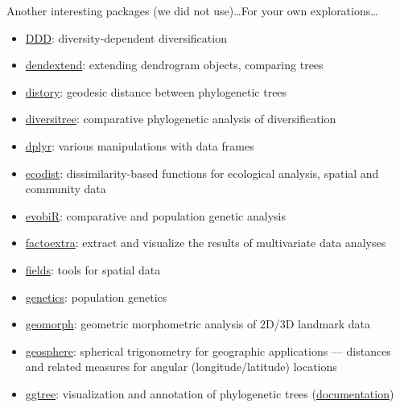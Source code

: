\documentclass[compress, xelatex, 11pt, xcolor=svgnames, aspectratio=169, url={hyphens, lowtilde}]{beamer}
\begin{document}
\begin{frame}[allowframebreaks]{Another interesting packages (we did not use)\ldots}{For your own explorations\ldots}
\begin{itemize}
		\item \href{https://CRAN.R-project.org/package=DDD}{DDD}: diversity-dependent diversification
		\item \href{https://CRAN.R-project.org/package=dendextend}{dendextend}: extending dendrogram objects, comparing trees
		\item \href{https://CRAN.R-project.org/package=distory}{distory}: geodesic distance between phylogenetic trees
		\item \href{https://CRAN.R-project.org/package=diversitree}{diversitree}: comparative phylogenetic analysis of diversification
		\item \href{https://CRAN.R-project.org/package=dplyr}{dplyr}: various manipulations with data frames
		\item \href{https://CRAN.R-project.org/package=ecodist}{ecodist}: dissimilarity-based functions for ecological analysis, spatial and community data
		\item \href{https://CRAN.R-project.org/package=evobiR}{evobiR}: comparative and population genetic analysis
		\item \href{https://CRAN.R-project.org/package=factoextra}{factoextra}: extract and visualize the results of multivariate data analyses
		\item \href{https://CRAN.R-project.org/package=fields}{fields}: tools for spatial data
		\item \href{https://CRAN.R-project.org/package=genetics}{genetics}: population genetics
		\item \href{https://CRAN.R-project.org/package=geomorph}{geomorph}: geometric morphometric analysis of 2D/3D landmark data
		\item \href{https://CRAN.R-project.org/package=geosphere}{geosphere}: spherical trigonometry for geographic applications --- distances and related measures for angular (longitude/latitude) locations
		\item \href{https://bioconductor.org/packages/release/bioc/html/ggtree.html}{ggtree}: visualization and annotation of phylogenetic trees (\href{https://guangchuangyu.github.io/software/ggtree/documentation/}{documentation})

\end{itemize}
\end{frame}
\end{document}
